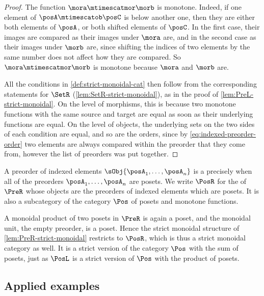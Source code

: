 \begin{proof}
    The function $\mora \mtimescatmor \morb$ is monotone.
    Indeed, if one element of $\posA \mtimescatob \posC$ is below another one, then they are either both elements of $\posA$, or both shifted elements of $\posC$.
    In the first case, their images are compared as their images under $\mora$ are, and in the second case as their images under $\morb$ are, since shifting the indices of two elements by the same number does not affect how they are compared.
    So $\mora \mtimescatmor \morb$ is monotone because $\mora$ and $\morb$ are.

    All the conditions in \cref{def:strict-monoidal-cat} then follow from the corresponding statements for $\SetR$ (\cref{lem:SetR-strict-monoidal}), as in the proof of \cref{lem:PreL-strict-monoidal}.
    On the level of morphisms, this is because two monotone functions with the same source and target are equal as soon as their underlying functions are equal.
    On the level of objects, the underlying sets on the two sides of each condition are equal, and so are the orders, since by \cref{eq:indexed-preorder-order} two elements are always compared within the preorder that they come from, however the list of preorders was put together.
\end{proof}

\begin{remark}
    \label{def:PosR}
    A preorder of indexed elements $\sObj{\posA_1,\ldots, \posA_n}$ is a  precisely when all of the preorders $\posA_1,\ldots, \posA_n$ are posets.
    We write $\PosR$ for the  of $\PreR$ whose objects are the preorders of indexed elements which are posets.
    It is also a subcategory of the category $\Pos$ of posets and monotone functions.

    A monoidal product of two posets in $\PreR$ is again a poset, and the monoidal unit, the empty preorder, is a poset.
    Hence the strict monoidal structure of \cref{lem:PreR-strict-monoidal} restricts to $\PosR$, which is thus a strict monoidal category as well.
    It is a strict version of the category $\Pos$ with the sum of posets, just as $\PosL$ is a strict version of $\Pos$ with the product of posets.
\end{remark}


\subsection{Applied examples}

